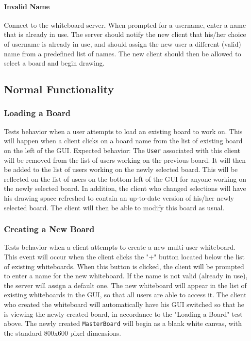 \paragraph{Invalid Name}
Connect to the whiteboard server. When prompted for a username, enter a name that is already in use. The server should notify the new client that his/her choice of username is already in use, and should assign the new user a different (valid) name from a predefined list of names.  The new client should then be allowed to select a board and begin drawing.

\subsection{Normal Functionality}

\subsubsection{Loading a Board}
Tests behavior when a user attempts to load an existing board to work on.  This will happen when a client clicks on a board name from the list of existing board on the left of the GUI.  Expected behavior: The \texttt{User} associated with this client will be removed from the list of users working on the previous board.  It will then be added to the list of users working on the newly selected board.  This will be reflected on the list of users on the bottom left of the GUI for anyone working on the newly selected board.  In addition, the client who changed selections will have his drawing space refreshed to contain an up-to-date version of his/her newly selected board.  The client will then be able to modify this board as usual.

\subsubsection{Creating a New Board}
Tests behavior when a client attempts to create a new multi-user whiteboard.  This event will occur when the client clicks the "+" button located below the list of existing whiteboards.  When this button is clicked, the client will be prompted to enter a name for the new whiteboard. If the name is not valid (already in use), the server will assign a default one.  The new whiteboard will appear in the list of existing whiteboards in the GUI, so that all users are able to access it.  The client who created the whiteboard will automatically have his GUI switched so that he is viewing the newly created board, in accordance to the "Loading a Board" test above. The newly created \texttt{MasterBoard} will begin as a blank white canvas, with the standard 800x600 pixel dimensions.

